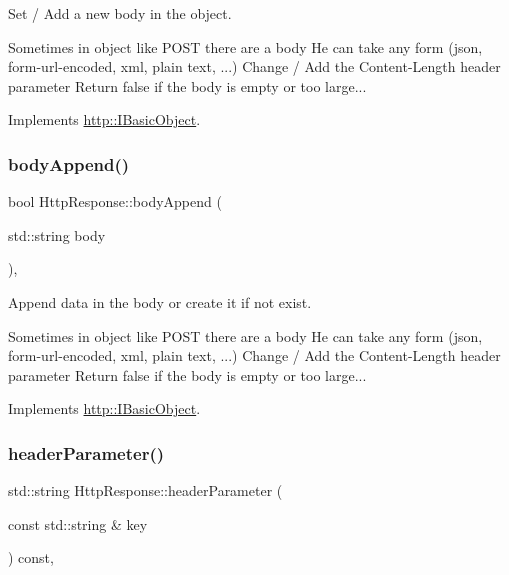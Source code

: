 Set / Add a new body in the object. 

Sometimes in object like P\+O\+ST there are a body He can take any form (json, form-\/url-\/encoded, xml, plain text, ...) Change / Add the \textquotesingle{}Content-\/\+Length\textquotesingle{} header parameter Return false if the body is empty or too large... 

Implements \hyperlink{structhttp_1_1IBasicObject_aa304f3a3137912f1dbff798531fa4c09}{http\+::\+I\+Basic\+Object}.

\mbox{\label{classHttpResponse_af8f8669568d6bcc7b0e3c7a247e456bd}} 
\subsubsection{\texorpdfstring{body\+Append()}{bodyAppend()}}
{\footnotesize\ttfamily bool Http\+Response\+::body\+Append (\begin{DoxyParamCaption}\item[{std\+::string}]{body }\end{DoxyParamCaption})\hspace{0.3cm}{\ttfamily [virtual]}, {\ttfamily [noexcept]}}



Append data in the body or create it if not exist. 

Sometimes in object like P\+O\+ST there are a body He can take any form (json, form-\/url-\/encoded, xml, plain text, ...) Change / Add the \textquotesingle{}Content-\/\+Length\textquotesingle{} header parameter Return false if the body is empty or too large... 

Implements \hyperlink{structhttp_1_1IBasicObject_abf2cb4a0e7908313b827ad4635bad730}{http\+::\+I\+Basic\+Object}.

\mbox{\label{classHttpResponse_a257c44a876f78e131e32d5af9f81d4fc}} 
\subsubsection{\texorpdfstring{header\+Parameter()}{headerParameter()}\hspace{0.1cm}{\footnotesize\ttfamily [1/2]}}
{\footnotesize\ttfamily std\+::string Http\+Response\+::header\+Parameter (\begin{DoxyParamCaption}\item[{const std\+::string \&}]{key }\end{DoxyParamCaption}) const\hspace{0.3cm}{\ttfamily [virtual]}, {\ttfamily [noexcept]}}



